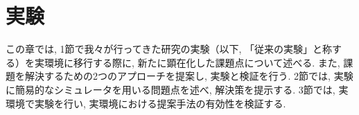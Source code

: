 \chapter{実験}
\label{chap:experiments}
この章では, 1節で我々が行ってきた研究\cite{mech}の実験（以下, 「従来の実験」と称する）を実環境に移行する際に, 新たに顕在化した課題点について述べる. また, 課題を解決するための2つのアプローチを提案し, 実験と検証を行う. 2節では, 実験に簡易的なシミュレータを用いる問題点を述べ, 解決策を提示する. 3節では, 実環境で実験を行い, 実環境における提案手法の有効性を検証する.  
%
%
%


%
